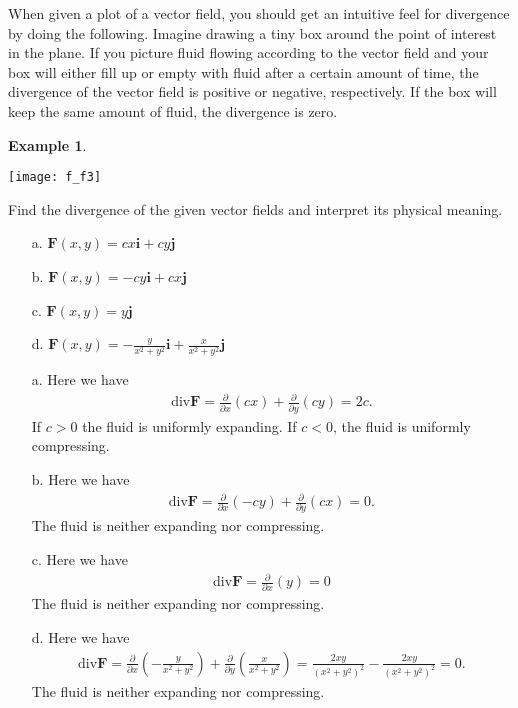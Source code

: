 \documentclass[12pt, letter]{article}
\theoremstyle{plain}
\numberwithin{theorem}{section}
\theoremstyle{definition}
\newtheorem{example}[theorem]{Example}
\begin{document}
\bigskip

\hrulefill

\bigskip

When given a plot of a vector field, you should get an intuitive feel for divergence by doing the following. Imagine drawing a tiny box around the point of interest in the plane. If you picture fluid flowing according to the vector field and your box will either fill up or empty with fluid after a certain amount of time, the divergence of the vector field is positive or negative, respectively. If the box will keep the same amount of fluid, the divergence is zero.

\bigskip

\hrulefill

\bigskip

\begin{example}

\bigskip

\begin{center}
\texttt{[image: f\_f3]}
\end{center}

\bigskip

Find the divergence of the given vector fields and interpret its physical meaning.
\begin{itemize}
\item[a.] $\bm{F}(x,y) = cx\bm{i}+cy\bm{j}$
\item[b.] $\bm{F}(x,y) = -cy\bm{i}+cx\bm{j}$
\item[c.] $\bm{F}(x,y) = y\bm{j}$
\item[d.] $\bm{F}(x,y) = -\frac{y}{x^2+y^2}\bm{i}+\frac{x}{x^2+y^2}\bm{j}$
\end{itemize}

\hrulefill

\begin{itemize}
\item[a.] Here we have
\begin{align*}
\text{div} \bm{F} = \frac{\partial}{\partial x} (cx)+\frac{\partial}{\partial y}(cy) =2c.
\end{align*}
If $c>0$ the fluid is uniformly expanding. If $c<0$, the fluid is uniformly compressing.
\item[b.] Here we have
\begin{align*}
\text{div} \bm{F} = \frac{\partial}{\partial x} (-cy)+\frac{\partial}{\partial y}(cx) =0.
\end{align*}
The fluid is neither expanding nor compressing.
\item[c.] Here we have
\begin{align*}
\text{div} \bm{F} = \frac{\partial}{\partial x} (y)=0
\end{align*}
The fluid is neither expanding nor compressing.
\item[d.] Here we have
\begin{align*}
\text{div} \bm{F} = \frac{\partial}{\partial x} \left(-\frac{y}{x^2+y^2}\right)+\frac{\partial}{\partial y}\left(\frac{x}{x^2+y^2}\right) = \frac{2xy}{(x^2+y^2)^2}-\frac{2xy}{(x^2+y^2)^2}=0.
\end{align*}
The fluid is neither expanding nor compressing.
\end{itemize}


\end{example}
\end{document}
